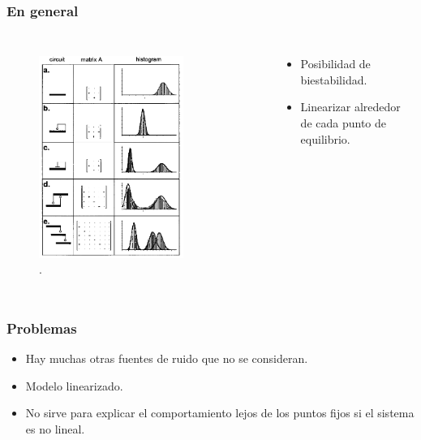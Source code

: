 \documentclass[10pt]{beamer}
\begin{document}
\begin{frame}
\frametitle{En general}
\begin{columns}[c]
\begin{figure}[p]
    \centering
    \includegraphics[width=0.75\textwidth]{graph4.png}\\
    \tiny \cite{thattai01}.
\end{figure}
\begin{itemize}
\item Posibilidad de biestabilidad.
\item Linearizar alrededor de cada punto de equilibrio.
\end{itemize}
\end{columns}
\end{frame}

\begin{frame}
\frametitle{Problemas}
\begin{itemize}
\item Hay muchas otras fuentes de ruido que no se consideran.
\item Modelo linearizado.
\item No sirve para explicar el comportamiento lejos de los puntos fijos si el sistema es no lineal.
\end{itemize}
\end{frame}
\end{document}
